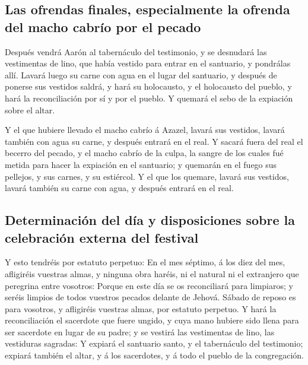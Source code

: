 \hypertarget{las-ofrendas-finales-especialmente-la-ofrenda-del-macho-cabruxedo-por-el-pecado}{%
\subsection{Las ofrendas finales, especialmente la ofrenda del macho
cabrío por el
pecado}\label{las-ofrendas-finales-especialmente-la-ofrenda-del-macho-cabruxedo-por-el-pecado}}

 Después vendrá Aarón al tabernáculo del testimonio, y se
desnudará las vestimentas de lino, que había vestido para entrar en el
santuario, y pondrálas allí.  Lavará luego su carne con
agua en el lugar del santuario, y después de ponerse sus vestidos
saldrá, y hará su holocausto, y el holocausto del pueblo, y hará la
reconciliación por sí y por el pueblo.  Y quemará el sebo
de la expiación sobre el altar.

 Y el que hubiere llevado el macho cabrío á Azazel, lavará
sus vestidos, lavará también con agua su carne, y después entrará en el
real.  Y sacará fuera del real el becerro del pecado, y el
macho cabrío de la culpa, la sangre de los cuales fué metida para hacer
la expiación en el santuario; y quemarán en el fuego sus pellejos, y sus
carnes, y su estiércol.  Y el que los quemare, lavará sus
vestidos, lavará también su carne con agua, y después entrará en el
real.

\hypertarget{determinaciuxf3n-del-duxeda-y-disposiciones-sobre-la-celebraciuxf3n-externa-del-festival}{%
\subsection{Determinación del día y disposiciones sobre la celebración
externa del
festival}\label{determinaciuxf3n-del-duxeda-y-disposiciones-sobre-la-celebraciuxf3n-externa-del-festival}}

 Y esto tendréis por estatuto perpetuo: En el mes séptimo,
á los diez del mes, afligiréis vuestras almas, y ninguna obra haréis, ni
el natural ni el extranjero que peregrina entre vosotros: 
Porque en este día se os reconciliará para limpiaros; y seréis limpios
de todos vuestros pecados delante de Jehová.  Sábado de
reposo es para vosotros, y afligiréis vuestras almas, por estatuto
perpetuo.  Y hará la reconciliación el sacerdote que fuere
ungido, y cuya mano hubiere sido llena para ser sacerdote en lugar de su
padre; y se vestirá las vestimentas de lino, las vestiduras sagradas:
 Y expiará el santuario santo, y el tabernáculo del
testimonio; expiará también el altar, y á los sacerdotes, y á todo el
pueblo de la congregación.

